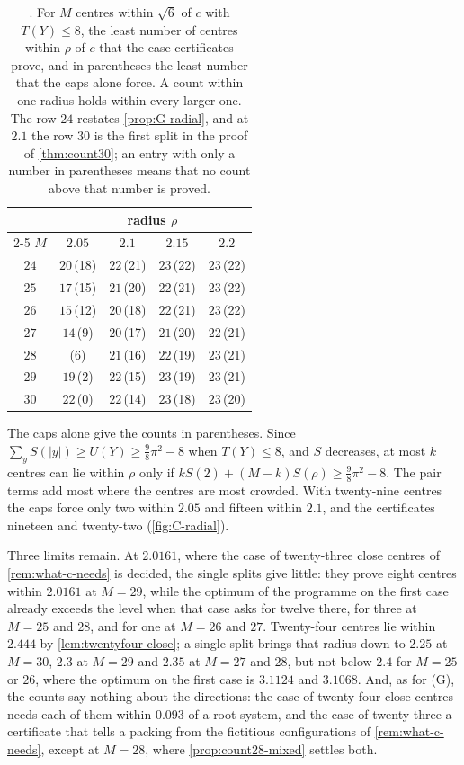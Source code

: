 \documentclass[11pt,reqno]{amsart}
\renewcommand{\_}{\origunderscore\allowbreak}
\numberwithin{equation}{section}
\theoremstyle{plain}
\theoremstyle{definition}
\theoremstyle{remark}
\begin{document}
\begin{table}[tb]
\centering
\caption{. For $M$ centres within $\sqrt6$ of $c$ with
$T(Y)\le8$, the least number of centres within $\rho$ of $c$ that the case
certificates prove, and in parentheses the least number that the caps alone
force. A count within one radius holds within every larger one. The row
$24$ restates \cref{prop:G-radial}, and at $2.1$ the row $30$ is the first
split in the proof of \cref{thm:count30}; an entry with only a number in
parentheses means that no count above that number is proved.}
\label{tab:C-radial}
\begin{tabular}{@{}c@{\qquad}cccc@{}}
\toprule
& \multicolumn{4}{c}{radius $\rho$}\\
\cmidrule(l){2-5}
$M$ & $2.05$ & $2.1$ & $2.15$ & $2.2$\\
\midrule
$24$ & $20$\,(18) & $22$\,(21) & $23$\,(22) & $23$\,(22)\\
$25$ & $17$\,(15) & $21$\,(20) & $22$\,(21) & $23$\,(22)\\
$26$ & $15$\,(12) & $20$\,(18) & $22$\,(21) & $23$\,(22)\\
$27$ & $14$\,(9) & $20$\,(17) & $21$\,(20) & $22$\,(21)\\
$28$ & (6) & $21$\,(16) & $22$\,(19) & $23$\,(21)\\
$29$ & $19$\,(2) & $22$\,(15) & $23$\,(19) & $23$\,(21)\\
$30$ & $22$\,(0) & $22$\,(14) & $23$\,(18) & $23$\,(20)\\
\bottomrule
\end{tabular}
\end{table}

The caps alone give the counts in parentheses. Since
$\sum_yS(|y|)\ge U(Y)\ge\frac98\pi^2-8$ when $T(Y)\le8$, and $S$ decreases,
at most $k$ centres can lie within $\rho$ only if
$kS(2)+(M-k)S(\rho)\ge\frac98\pi^2-8$. The pair terms add most where the
centres are most crowded. With twenty-nine centres the caps force only two
within $2.05$ and fifteen within $2.1$, and the certificates nineteen and
twenty-two (\cref{fig:C-radial}).

Three limits remain. At $2.0161$, where the case of twenty-three close
centres of \cref{rem:what-c-needs} is decided, the single splits give
little: they prove eight centres within $2.0161$ at $M=29$, while the
optimum of the programme on the first case already exceeds the level when
that case asks for twelve there, for three at $M=25$ and $28$, and for one at
$M=26$ and $27$. Twenty-four centres lie within
$2.444$ by \cref{lem:twentyfour-close}; a single split brings that radius
down to $2.25$ at $M=30$, $2.3$ at $M=29$ and $2.35$ at $M=27$ and $28$,
but not below $2.4$ for $M=25$ or $26$, where the optimum on the first case
is $3.1124$ and $3.1068$. And, as for (G), the counts say
nothing about the directions: the case of twenty-four close centres needs
each of them within $0.093$ of a root system, and the case of twenty-three
a certificate that tells a packing from the fictitious configurations of
\cref{rem:what-c-needs}, except at $M=28$, where \cref{prop:count28-mixed}
settles both.
\end{document}
